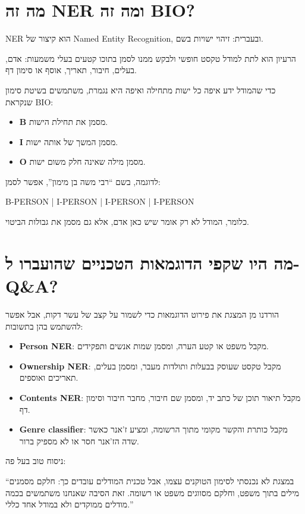\documentclass[12pt,a4paper]{article}
\begin{document}
\section{\texthebrew{מה זה NER ומה זה BIO?}}
\begin{hebrew}
NER הוא קיצור של \textenglish{Named Entity Recognition}, ובעברית: זיהוי ישויות בשם.
\par
הרעיון הוא לתת למודל טקסט חופשי ולבקש ממנו לסמן בתוכו קטעים בעלי משמעות: אדם, בעלים, חיבור, תאריך, אוסף או סימון דף.
\par
כדי שהמודל ידע איפה כל ישות מתחילה ואיפה היא נגמרת, משתמשים בשיטת סימון שנקראת BIO:
\begin{itemize}
  \item \textbf{B} מסמן את תחילת הישות.
  \item \textbf{I} מסמן המשך של אותה ישות.
  \item \textbf{O} מסמן מילה שאינה חלק משום ישות.
\end{itemize}
\par
לדוגמה, בשם ``רבי משה בן מימון'', אפשר לסמן:
\par
\textenglish{B-PERSON | I-PERSON | I-PERSON | I-PERSON}
\par
כלומר, המודל לא רק אומר שיש כאן אדם, אלא גם מסמן את גבולות הביטוי.
\end{hebrew}

\section{\texthebrew{מה היו שקפי הדוגמאות הטכניים שהועברו ל-Q\&A?}}
\begin{hebrew}
הורדנו מן המצגת את פירוט הדוגמאות כדי לשמור על קצב של עשר דקות, אבל אפשר להשתמש בהן בתשובות:
\begin{itemize}
  \item \textbf{Person NER}: מקבל משפט או קטע הערה, ומסמן שמות אנשים ותפקידים.
  \item \textbf{Ownership NER}: מקבל טקסט שעוסק בבעלות ותולדות מעבר, ומסמן בעלים, תאריכים ואוספים.
  \item \textbf{Contents NER}: מקבל תיאור תוכן של כתב יד, ומסמן שם חיבור, מחבר חיבור וסימון דף.
  \item \textbf{Genre classifier}: מקבל כותרת והקשר מקומי מתוך הרשומה, ומציע ז'אנר כאשר שדה הז'אנר חסר או לא מספיק ברור.
\end{itemize}
\par
ניסוח טוב בעל פה:
\par
``במצגת לא נכנסתי לסימון הטוקנים עצמו, אבל טכנית המודלים עובדים כך: חלקם מסמנים מילים בתוך משפט, וחלקם מסווגים משפט או רשומה. זאת הסיבה שאנחנו משתמשים בכמה מודלים ממוקדים ולא במודל אחד כללי.''
\end{hebrew}
\end{document}
